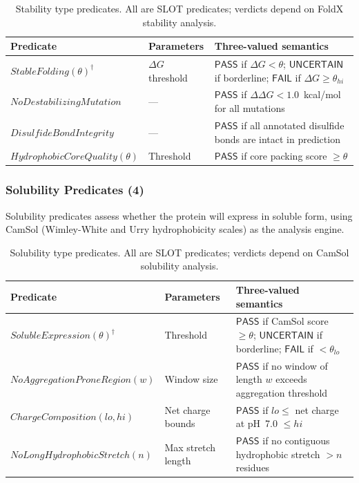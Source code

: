 \documentclass[acmsmall,review,anonymous]{acmart}
\newcommand{\PASS}{\ensuremath{\mathsf{PASS}}\xspace}
\newcommand{\FAIL}{\ensuremath{\mathsf{FAIL}}\xspace}
\newcommand{\UNCERTAIN}{\ensuremath{\mathsf{UNCERTAIN}}\xspace}
\begin{document}
\begin{table}[t]
\centering
\caption{Stability type predicates. All are SLOT predicates; verdicts
         depend on FoldX stability analysis.}
\label{tab:stab-predicates}
\begin{tabular}{llp{4.6cm}}
\toprule
\textbf{Predicate} & \textbf{Parameters} & \textbf{Three-valued semantics} \\
\midrule
$\mathit{StableFolding}(\theta)^\dagger$ & $\Delta G$ threshold &
  \PASS{} if $\Delta G < \theta$; \UNCERTAIN{} if borderline;
  \FAIL{} if $\Delta G \ge \theta_{\mathit{hi}}$ \\
$\mathit{NoDestabilizingMutation}$ & --- &
  \PASS{} if $\Delta\Delta G < 1.0$~kcal/mol for all mutations \\
$\mathit{DisulfideBondIntegrity}$ & --- &
  \PASS{} if all annotated disulfide bonds are intact in prediction \\
$\mathit{HydrophobicCoreQuality}(\theta)$ & Threshold &
  \PASS{} if core packing score $\ge \theta$ \\
\bottomrule
\end{tabular}
\end{table}

\subsubsection{Solubility Predicates (4)}

Solubility predicates assess whether the protein will express in
soluble form, using CamSol (Wimley-White and Urry hydrophobicity
scales) as the analysis engine.

\begin{table}[t]
\centering
\caption{Solubility type predicates. All are SLOT predicates; verdicts
         depend on CamSol solubility analysis.}
\label{tab:sol-predicates}
\begin{tabular}{llp{4.6cm}}
\toprule
\textbf{Predicate} & \textbf{Parameters} & \textbf{Three-valued semantics} \\
\midrule
$\mathit{SolubleExpression}(\theta)^\dagger$ & Threshold &
  \PASS{} if CamSol score $\ge \theta$; \UNCERTAIN{} if
  borderline; \FAIL{} if $< \theta_{\mathit{lo}}$ \\
$\mathit{NoAggregationProneRegion}(w)$ & Window size &
  \PASS{} if no window of length $w$ exceeds aggregation threshold \\
$\mathit{ChargeComposition}(lo,hi)$ & Net charge bounds &
  \PASS{} if $lo \le$ net charge at pH~7.0 $\le hi$ \\
$\mathit{NoLongHydrophobicStretch}(n)$ & Max stretch length &
  \PASS{} if no contiguous hydrophobic stretch $> n$ residues \\
\bottomrule
\end{tabular}
\end{table}
\end{document}
